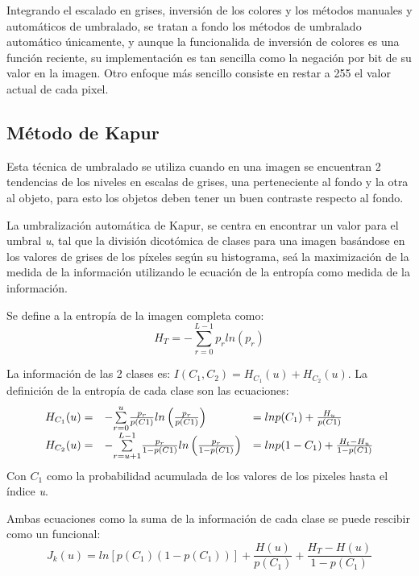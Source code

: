 \hfill\break
\justifying
Integrando el escalado en grises, inversión de los colores y los métodos manuales y automáticos de umbralado, se tratan a fondo los métodos de umbralado automático únicamente, y aunque la funcionalida de inversión de colores es una función reciente, su implementación es tan sencilla como la negación por bit de su valor en la imagen. Otro enfoque más sencillo consiste en restar a 255 el valor actual de cada pixel.

\subsection*{Método de Kapur}
	\hfill\break
	\justifying
	Esta técnica de umbralado se utiliza cuando en una imagen se encuentran 2 tendencias de los niveles en escalas de grises, una perteneciente al fondo y la otra al objeto, para esto los objetos deben tener un buen contraste respecto al fondo.
	
	\hfill\break
	\justifying
	La umbralización automática de Kapur, se centra en encontrar un valor para el umbral \textit{u}, tal que la división dicotómica de clases para una imagen basándose en los valores de grises de los píxeles según su histograma, seá la maximización de la medida de la información utilizando le ecuación de la entropía como medida de la información.
	
	\hfill\break
	\justifying
	Se define a la entropía de la imagen completa como:
	\begin{equation*}
		H_T = -\sum_{r=0}^{L-1} p_r ln(p_r)
	\end{equation*}
	
	\hfill\break
	\justifying
	La información de las 2 clases es: $I(C_1,C_2)=H_{C_1}(u)+H_{C_2}(u)$. La definición de la entropía de cada clase son las ecuaciones:
	{\large \begin{equation*}
		\begin{array}{r l l}
			H_{C_1}(u)= & -\overset{u}{\underset{r=0}{\sum}}\frac{p_r}{p(C1)}ln\left( \frac{p_r}{p(C1)} \right) & = lnp(C_1)+\frac{H_u}{p(C1)}\\
			H_{C_2}(u)= & -\overset{L-1}{\underset{r=u+1}{\sum}}\frac{p_r}{1-p(C1)}ln\left( \frac{p_r}{1-p(C1)} \right) & = lnp(1-C_1)+\frac{H_t-H_u}{1-p(C1)}\\
		\end{array}
	\end{equation*}}
	Con $C_1$ como la probabilidad acumulada de los valores de los pixeles hasta el índice \textit{u}.

	\hfill\break
	\justifying
	Ambas ecuaciones como la suma de la información de cada clase se puede rescibir como un funcional:
	{\Large \begin{equation*}
		J_k(u) = ln[p(C_1)(1-p(C_1))]+\frac{H(u)}{p(C_1)}+\frac{H_T-H(u)}{1-p(C_1)}
	\end{equation*}}
	
